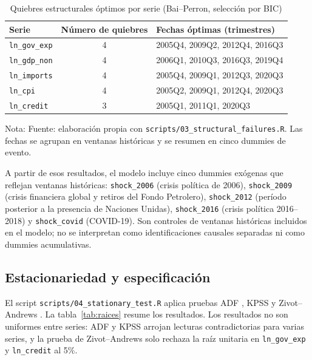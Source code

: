 \documentclass[11pt,a4paper]{article}
\begin{document}
\begin{table}[htbp]
\centering
\small
\begin{threeparttable}
\caption{Quiebres estructurales óptimos por serie (Bai--Perron, selección por BIC)}
\label{tab:quiebres}
\begin{tabular}{@{}lcl@{}}
\toprule
Serie & Número de quiebres & Fechas óptimas (trimestres) \\
\midrule
\texttt{ln\_gov\_exp} & 4 & 2005Q4, 2009Q2, 2012Q4, 2016Q3 \\
\texttt{ln\_gdp\_non} & 4 & 2006Q1, 2010Q3, 2016Q3, 2019Q4 \\
\texttt{ln\_imports}  & 4 & 2005Q4, 2009Q1, 2012Q3, 2020Q3 \\
\texttt{ln\_cpi}      & 4 & 2005Q2, 2009Q1, 2012Q4, 2020Q3 \\
\texttt{ln\_credit}   & 3 & 2005Q1, 2011Q1, 2020Q3 \\
\bottomrule
\end{tabular}
\begin{tablenotes}\footnotesize
\item Nota: Fuente: elaboración propia con \texttt{scripts/03\_structural\_failures.R}. Las fechas se agrupan en ventanas históricas y se resumen en cinco dummies de evento.
\end{tablenotes}
\end{threeparttable}
\end{table}

A partir de esos resultados, el modelo incluye cinco dummies exógenas que
reflejan ventanas históricas: \texttt{shock\_2006} (crisis política de
2006), \texttt{shock\_2009} (crisis financiera global y retiros del Fondo
Petrolero), \texttt{shock\_2012} (período posterior a la presencia de
Naciones Unidas), \texttt{shock\_2016} (crisis política 2016--2018) y
\texttt{shock\_covid} (COVID-19). Son controles de ventanas históricas
incluidos en el modelo; no se interpretan como identificaciones causales
separadas ni como dummies acumulativas.

\subsection{Estacionariedad y especificación}
\label{sec:estacionariedad}

El script \texttt{scripts/04\_stationary\_test.R} aplica pruebas ADF
\parencite{dickeyfuller1979}, KPSS \parencite{kpss1992} y Zivot--Andrews
\parencite{zivot1992}. La tabla~\ref{tab:raices} resume los resultados. Los
resultados no son uniformes entre series: ADF y KPSS arrojan lecturas
contradictorias para varias series, y la prueba de Zivot--Andrews solo rechaza
la raíz unitaria en \texttt{ln\_gov\_exp} y \texttt{ln\_credit} al 5\%.
\end{document}
